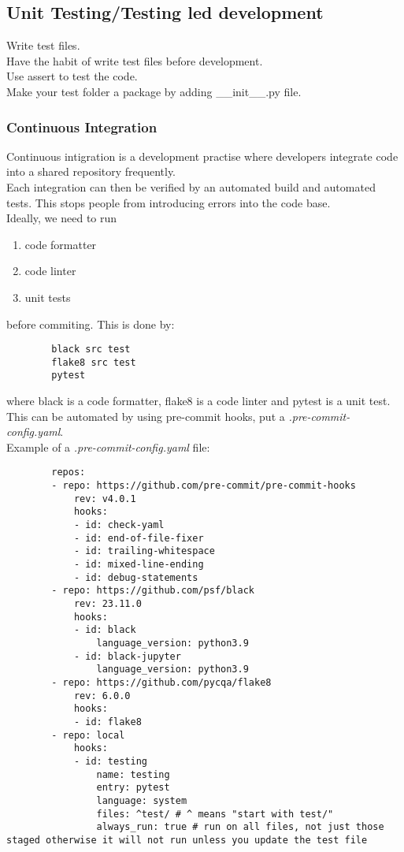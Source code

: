\documentclass[12pt,a4paper]{article}
\begin{document}
\subsection{Unit Testing/Testing led development}
    Write test files.\\
    Have the habit of write test files before development.\\
    Use assert to test the code.\\
    Make your test folder a package by adding \_\_init\_\_.py file.\\
\subsubsection{Continuous Integration}
    Continuous intigration is a development practise where developers integrate code into a shared repository frequently.\\ Each integration can then be verified by an automated build and automated tests. This stops people from introducing errors into the code base.\\
    Ideally, we need to run
    \begin{enumerate}
        \item code formatter
        \item code linter
        \item unit tests
    \end{enumerate}
    before commiting.
    This is done by:
    \begin{lstlisting}
        black src test
        flake8 src test
        pytest
    \end{lstlisting}
    where black is a code formatter, flake8 is a code linter and pytest is a unit test.\\
    This can be automated by using pre-commit hooks, put a \textit{.pre-commit-config.yaml}.\\
    Example of a \textit{.pre-commit-config.yaml} file:
    \begin{lstlisting}
        repos:
        - repo: https://github.com/pre-commit/pre-commit-hooks
            rev: v4.0.1
            hooks:
            - id: check-yaml
            - id: end-of-file-fixer
            - id: trailing-whitespace
            - id: mixed-line-ending
            - id: debug-statements
        - repo: https://github.com/psf/black
            rev: 23.11.0
            hooks:
            - id: black
                language_version: python3.9
            - id: black-jupyter
                language_version: python3.9
        - repo: https://github.com/pycqa/flake8
            rev: 6.0.0
            hooks:
            - id: flake8
        - repo: local
            hooks:
            - id: testing
                name: testing
                entry: pytest
                language: system
                files: ^test/ # ^ means "start with test/"
                always_run: true # run on all files, not just those staged otherwise it will not run unless you update the test file
    \end{lstlisting}
\end{document}
